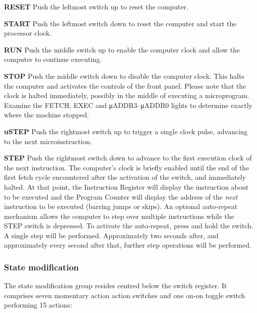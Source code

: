 \documentclass[11pt,a4paper,twocolumns]{article}
\newcommand{\lt}[1]{\textsf{#1}}
\newcommand{\sw}[1]{\textsf{#1}}
\begin{document}
\begin{description}
\item{\bf\sw{RESET}} Push the leftmost switch up to reset the
computer.
\item{\bf\sw{START}} Push the leftmost switch down to reset the
computer and start the processor clock.
\item{\bf\sw{RUN}} Push the middle switch up to enable the computer
  clock and allow the computer to continue executing.
\item{\bf\sw{STOP}} Push the middle switch down to disable the
  computer clock. This halts the computer and activates the controls
  of the front panel. Please note that the clock is halted
  immediately, possibly in the middle of executing a
  microprogram. Examine the \lt{FETCH}, \lt{EXEC} and
  \lt{μADDR3}–\lt{μADDR0} lights to determine exactly where the
  machine stopped.
\item{\bf\sw{uSTEP}} Push the rightmost switch up to trigger a single
  clock pulse, advancing to the next microinstruction.
\item{\bf\sw{STEP}} Push the rightmost switch down to advance to the
  first execution clock of the next instruction. The computer's clock
  is briefly enabled until the end of the first fetch cycle
  encountered after the activation of the switch, and immediately
  halted. At that point, the Instruction Register will display the
  instruction about to be executed and the Program Counter will
  display the address of the {\em next\/} instruction to be executed
  (barring jumps or skips). An optional auto-repeat mechanism allows
  the computer to step over multiple instructions while the \sw{STEP}
  switch is depressed. To activate the auto-repeat, press and hold the
  switch. A single step will be performed. Approximately two seconds
  after, and approximately every second after that, further step
  operations will be performed.
\end{description}

\subsubsection{State modification}

The state modification group resides centred below the switch
register. It comprises seven momentary action action switches and one
on-on toggle switch performing 15 actions:
\end{document}
